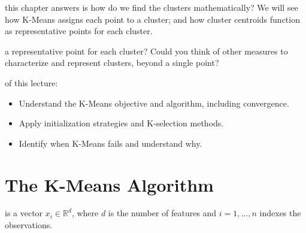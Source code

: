  this chapter answers is how do we find the clusters mathematically? 
We will see how K-Means assigns each point to a cluster; and how cluster centroids function as representative points for each cluster.



 a representative point for each cluster?
Could you think of other measures to characterize and represent clusters, beyond a single point?


 of this lecture:
\begin{itemize}
    \item Understand the K-Means objective and algorithm, including convergence.
    \item Apply initialization strategies and K-selection methods.
    \item Identify when K-Means fails and understand why.
\end{itemize}









\newpage

\section{The K-Means Algorithm}

 is a vector $x_i \in \mathbb{R}^d$, where $d$ is the number of features and $i = 1, \ldots, n$ indexes the observations.

